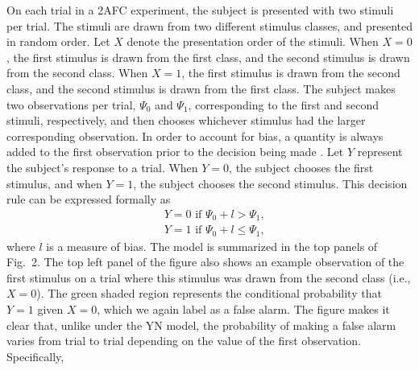 \documentclass[man]{apa6}
\begin{document}
On each trial in a 2AFC experiment, the subject is presented with two stimuli per trial. The stimuli are drawn from two different stimulus classes, and presented in random order. Let $X$ denote the presentation order of the stimuli. When $X=0$, the first stimulus is drawn from the first class, and the second stimulus is drawn from the second class. When $X=1$, the first stimulus is drawn from the second class, and the second stimulus is drawn from the first class. The subject makes two observations per trial, $\Psi_0$ and $\Psi_1$, corresponding to the first and second stimuli, respectively, and then chooses whichever stimulus had the larger corresponding observation. In order to account for bias, a quantity is always added to the first observation prior to the decision being made \parencite[see][]{decarloon2012}. Let $Y$ represent the subject's response to a trial. When $Y=0$, the subject chooses the first stimulus, and when $Y=1$, the subject chooses the second stimulus. This decision rule can be expressed formally as
\begin{eqnarray*}
&Y=0\textrm{ if }\Psi_0+l>\Psi_1\textrm{,}\\
&Y=1\textrm{ if }\Psi_0+l\le\Psi_1\textrm{,}
\end{eqnarray*}where $l$ is a measure of bias. The model is summarized in the top panels of Fig.~2. The top left panel of the figure also shows an example observation of the first stimulus on a trial where this stimulus was drawn from the second class (i.e., $X=0$). The green shaded region represents the conditional probability that $Y=1$ given $X=0$, which we again label as a false alarm. The figure makes it clear that, unlike under the YN model, the probability of making a false alarm varies from trial to trial depending on the value of the first observation. Specifically,
\end{document}
